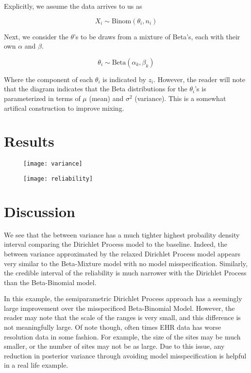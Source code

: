 \documentclass{article}
\begin{document}
Explicitly, we assume the data arrives to us as

\begin{equation}\label{eq:data}
    X_i \sim \text{Binom}(\theta_i, n_i)
\end{equation}

Next, we consider the $\theta$'s to be draws from a mixture of Beta's, each with their own $\alpha$ and $\beta$.

\begin{equation}\label{eq:theta}
    \theta_i \sim \text{Beta}(\alpha_k, \beta_k)
\end{equation}

Where the component of each $\theta_i$ is indicated by $z_i$. However, the reader will note that the diagram indicates that the Beta distributions for the $\theta_i$'s is parameterized in terms of $\mu$ (mean) and $\sigma^2$ (variance). This is a somewhat artifical construction to improve mixing.

\section{Results}

\begin{figure}
\texttt{[image: variance]}
\end{figure}

\begin{figure}
\texttt{[image: reliability]}
\end{figure}

\section{Discussion}

We see that the between variance has a much tighter highest probaility density interval comparing the Dirichlet Process model to the baseline. Indeed, the between variance approximated by the relaxed Dirichlet Process model appears very similar to the Beta-Mixture model with no model misspecification. Similarly, the credible interval of the reliability is much narrower with the Dirichlet Process than the Beta-Binomial model.

In this example, the semiparametric Dirichlet Process approach has a seemingly large improvement over the misspecificed Beta-Binomial Model. However, the reader may note that the scale of the ranges is very small, and this difference is not meaningfully large. Of note though, often times EHR data has worse resolution data in some fashion. For example, the size of the sites may be much smaller, or the number of sites may not be as large. Due  to this issue, any reduction in posterior variance through avoiding model misspecification is helpful in a real life example.
\end{document}
